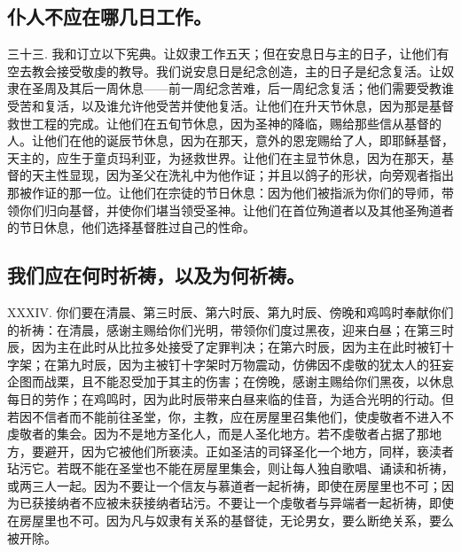 
\subsection{仆人不应在哪几日工作。}

三十三. 我和订立以下宪典。让奴隶工作五天；但在安息日与主的日子，让他们有空去教会接受敬虔的教导。我们说安息日是纪念创造，主的日子是纪念复活。让奴隶在圣周及其后一周休息——前一周纪念苦难，后一周纪念复活；他们需要受教谁受苦和复活，以及谁允许他受苦并使他复活。让他们在升天节休息，因为那是基督救世工程的完成。让他们在五旬节休息，因为圣神的降临，赐给那些信从基督的人。让他们在他的诞辰节休息，因为在那天，意外的恩宠赐给了人，即耶稣基督，天主的，应生于童贞玛利亚，为拯救世界。让他们在主显节休息，因为在那天，基督的天主性显现，因为圣父在洗礼中为他作证；并且以鸽子的形状，向旁观者指出那被作证的那一位。让他们在宗徒的节日休息：因为他们被指派为你们的导师，带领你们归向基督，并使你们堪当领受圣神。让他们在首位殉道者以及其他圣殉道者的节日休息，他们选择基督胜过自己的性命。\par


\subsection{我们应在何时祈祷，以及为何祈祷。}

XXXIV. 你们要在清晨、第三时辰、第六时辰、第九时辰、傍晚和鸡鸣时奉献你们的祈祷：在清晨，感谢主赐给你们光明，带领你们度过黑夜，迎来白昼；在第三时辰，因为主在此时从比拉多处接受了定罪判决；在第六时辰，因为主在此时被钉十字架；在第九时辰，因为主被钉十字架时万物震动，仿佛因不虔敬的犹太人的狂妄企图而战栗，且不能忍受加于其主的伤害；在傍晚，感谢主赐给你们黑夜，以休息每日的劳作；在鸡鸣时，因为此时辰带来白昼来临的佳音，为适合光明的行动。但若因不信者而不能前往圣堂，你，主教，应在房屋里召集他们，使虔敬者不进入不虔敬者的集会。因为不是地方圣化人，而是人圣化地方。若不虔敬者占据了那地方，要避开，因为它被他们所亵渎。正如圣洁的司铎圣化一个地方，同样，亵渎者玷污它。若既不能在圣堂也不能在房屋里集会，则让每人独自歌唱、诵读和祈祷，或两三人一起。因为不要让一个信友与慕道者一起祈祷，即使在房屋里也不可；因为已获接纳者不应被未获接纳者玷污。不要让一个虔敬者与异端者一起祈祷，即使在房屋里也不可。因为凡与奴隶有关系的基督徒，无论男女，要么断绝关系，要么被开除。\par

